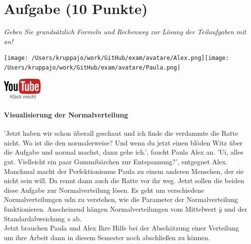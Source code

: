 \documentclass[a4paper, 9pt]{scrartcl}\usepackage[]{graphicx}\usepackage[]{xcolor}
\begin{document}
\section{Aufgabe \hfill (10 Punkte)}

\textit{Geben Sie grundsätzlich Formeln und Rechenweg zur Lösung der Teilaufgaben mit an!} \\[1Ex]
 

 
\begin{minipage}[t]{0.5\textwidth}
\texttt{[image: /Users/kruppajo/work/GitHub/exam/avatare/Alex.png]}\hspace{-4mm}\texttt{[image: /Users/kruppajo/work/GitHub/exam/avatare/Paula.png]}
\end{minipage}
\begin{minipage}[t]{0.5\textwidth}
\hfill
\href{https://youtu.be/ZrJhn2wPbq4}{\includegraphics[width = 2cm]{img/youtube}}
\end{minipage}



\paragraph{Visualisierung der Normalverteilung}

'Jetzt haben wir schon überall geschaut und ich finde die verdammte die Ratte nicht. Wo ist die den normalerweise? Und wenn du jetzt einen blöden Witz über die Aufgabe und normal machst, dann gehe ich.', faucht Paula Alex an. 'Ui, alles gut. Vielleicht ein paar Gummibärchen zur Entspannung?', entgegnet Alex. Manchmal macht der Perfektionismus Paula zu einem anderen Menschen, der sie nicht sein will. Da rennt dann auch die Ratte vor ihr weg. Jetzt sollen die beiden diese Aufgabe zur Normalverteilung lösen. Es geht um verschiedene Normalverteilungen udn zu verstehen, wie die Parameter der Normalverteilung funktionieren. Anscheinend hängen Normalverteilungen vom Mittelwert $\bar{y}$ und der Standardabweichung $s$ ab.\\



Jetzt brauchen Paula und Alex Ihre Hilfe bei der Abschätzung einer Verteilung um ihre Arbeit dann in diesem Semester noch abschließen zu können.
\end{document}

